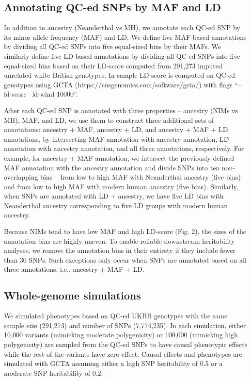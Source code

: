 \subsection{Annotating QC-ed SNPs by MAF and LD}
In addition to ancestry (Neanderthal vs MH), we annotate each QC-ed SNP by its minor allele frequency (MAF) and LD. We define five MAF-based annotations by dividing all QC-ed SNPs into five equal-sized bins by their MAFs. We similarly define five LD-based annotations by dividing all QC-ed SNPs into five equal-sized bins based on their LD-score computed from 291,273 imputed unrelated white British genotypes. In-sample LD-score is computed on QC-ed genotypes using GCTA (https://cnsgenomics.com/software/gcta/)  with flags ``--ld-score --ld-wind 10000''.

After each QC-ed SNP is annotated with three properties -- ancestry (NIMs vs MH), MAF, and LD, we use them to construct three additional sets of annotations: ancestry + MAF, ancestry + LD, and ancestry + MAF + LD annotations, by intersecting MAF annotation with ancestry annotation, LD annotation with ancestry annotation, and all three annotations, respectively. For example, for ancestry + MAF annotation, we intersect the previously defined MAF annotation with the ancestry annotation and divide SNPs into ten non-overlapping bins -- from low to high MAF with Neanderthal ancestry (five bins) and from low to high MAF with modern human ancestry (five bins). Similarly, when SNPs are annotated with LD + ancestry, we have five LD bins with Neanderthal ancestry corresponding to five LD groups with modern human ancestry. 

Because NIMs tend to have low MAF and high LD-score (Fig. 2), the sizes of the annotation bins are highly uneven. To enable reliable downstream heritability analyses, we remove the annotation bins in their entirety if they include fewer than 30 SNPs. Such exceptions only occur when SNPs are annotated based on all three annotations, i.e., ancestry + MAF + LD. 

\subsection{Whole-genome simulations}
We simulated phenotypes based on QC-ed UKBB genotypes with the same sample size (291,273) and number of SNPs (7,774,235). In each simulation, either 10,000 variants (mimicking moderate polygenicity) or 100,000 (mimicking high polygenicity) are sampled from the QC-ed SNPs to have causal phenotypic effects while the rest of the variants have zero effect. Causal effects and phenotypes are simulated with GCTA assuming either a high SNP heritability of 0.5 or a moderate SNP heritability of 0.2.

